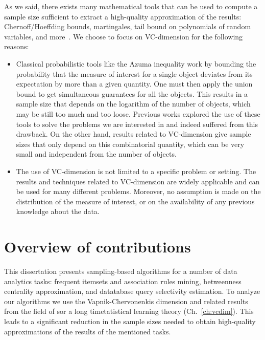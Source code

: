 As we said, there exists many mathematical tools that can be used to compute a
sample size sufficient to extract a high-quality approximation of the results:
Chernoff/Hoeffding bounds, martingales, tail bound
on polynomials of random variables, and
more~\citep{MitzenmacherU05,AlonS08,DubhashiP09}. We choose to focus on
VC-dimension for the following reasons:
\begin{itemize}
  \item Classical probabilistic tools like the Azuma inequality work by bounding
    the probability that the measure of interest for a single object deviates
    from its expectation by more than a given quantity. One must then apply the
    union bound to get simultaneous guarantees for all the objects. This results
    in a sample size that depends on the logarithm of the number of objects,
    which may be still too much and too loose. Previous works explored the use
    of these tools to solve the problems we are interested in and indeed
    suffered from this drawback. On the other hand, results related to
    VC-dimension give sample sizes that only depend on this combinatorial
    quantity, which can be very small and independent from the number of
    objects.
  \item The use of VC-dimension is not limited to a specific problem or setting.
    The results and techniques related to VC-dimension are widely applicable and
    can be used for many different problems. Moreover, no assumption is made on
    the distribution of the measure of interest, or on the availability of any
    previous knowledge about the data.
\end{itemize}

\section{Overview of contributions}
This dissertation presents sampling-based algorithms for a number of data
analytics tasks: frequent itemsets and association rules mining, betweenness
centrality approximation, and datatabase query selectivity estimation. To
analyze our algorithms we use the Vapnik-Chervonenkis dimension and related
results from the field of sor a long timetatistical learning theory (Ch.~\ref{ch:vcdim}). This
leads to a significant reduction in the sample sizes needed to obtain
high-quality approximations of the results of the mentioned tasks.

